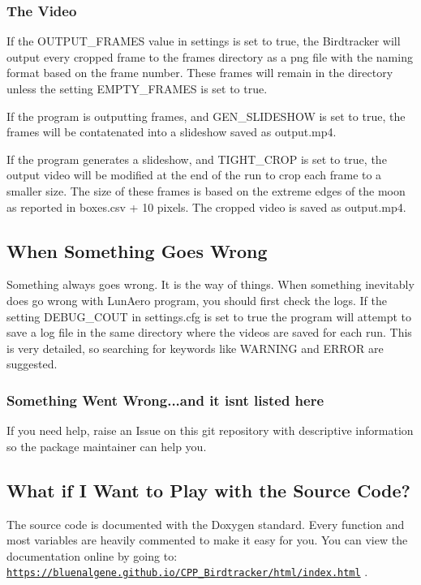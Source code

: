 \subsubsection*{The Video}

If the {\ttfamily O\+U\+T\+P\+U\+T\+\_\+\+F\+R\+A\+M\+ES} value in settings is set to {\ttfamily true}, the Birdtracker will output every cropped frame to the {\ttfamily frames} directory as a {\ttfamily png} file with the naming format based on the frame number. These frames will remain in the directory unless the setting {\ttfamily E\+M\+P\+T\+Y\+\_\+\+F\+R\+A\+M\+ES} is set to {\ttfamily true}.

If the program is outputting frames, and {\ttfamily G\+E\+N\+\_\+\+S\+L\+I\+D\+E\+S\+H\+OW} is set to {\ttfamily true}, the frames will be contatenated into a slideshow saved as {\ttfamily output.\+mp4}.

If the program generates a slideshow, and {\ttfamily T\+I\+G\+H\+T\+\_\+\+C\+R\+OP} is set to {\ttfamily true}, the output video will be modified at the end of the run to crop each frame to a smaller size. The size of these frames is based on the extreme edges of the moon as reported in {\ttfamily boxes.\+csv} + 10 pixels. The cropped video is saved as {\ttfamily output.\+mp4}.

\subsection*{When Something Goes Wrong}

Something always goes wrong. It is the way of things. When something inevitably does go wrong with Lun\+Aero program, you should first check the logs. If the setting {\ttfamily D\+E\+B\+U\+G\+\_\+\+C\+O\+UT} in {\ttfamily settings.\+cfg} is set to {\ttfamily true} the program will attempt to save a log file in the same directory where the videos are saved for each run. This is very detailed, so searching for keywords like {\ttfamily W\+A\+R\+N\+I\+NG} and {\ttfamily E\+R\+R\+OR} are suggested.

\subsubsection*{Something Went Wrong...and it isn\textquotesingle{}t listed here}

If you need help, raise an Issue on this {\ttfamily git} repository with descriptive information so the package maintainer can help you.

\subsection*{What if I Want to Play with the Source Code?}

The source code is documented with the {\ttfamily Doxygen} standard. Every function and most variables are heavily commented to make it easy for you. You can view the documentation online by going to\+: \href{https://bluenalgene.github.io/CPP_Birdtracker/html/index.html}{\tt https\+://bluenalgene.\+github.\+io/\+C\+P\+P\+\_\+\+Birdtracker/html/index.\+html} . 